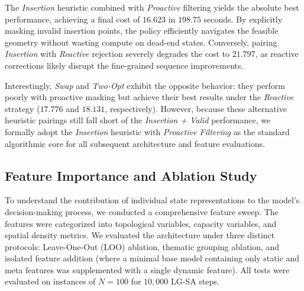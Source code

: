 \documentclass[letterpaper]{article} %
\begin{document}
The \textit{Insertion} heuristic combined with \textit{Proactive} filtering yields the absolute best performance, achieving a final cost of $16.623$ in $198.75$ seconds. By explicitly masking invalid insertion points, the policy efficiently navigates the feasible geometry without wasting compute on dead-end states. Conversely, pairing \textit{Insertion} with \textit{Reactive} rejection severely degrades the cost to $21.797$, as reactive corrections likely disrupt the fine-grained sequence improvements.

Interestingly, \textit{Swap} and \textit{Two-Opt} exhibit the opposite behavior: they perform poorly with proactive masking but achieve their best results under the \textit{Reactive} strategy ($17.776$ and $18.131$, respectively). However, because these alternative heuristic pairings still fall short of the \textit{Insertion + Valid} performance, we formally adopt the \textit{Insertion} heuristic with \textit{Proactive Filtering} as the standard algorithmic core for all subsequent architecture and feature evaluations.

\subsection{Feature Importance and Ablation Study}
\label{sec:feature_ablation}

To understand the contribution of individual state representations to the model's decision-making process, we conducted a comprehensive feature sweep. The features were categorized into topological variables, capacity variables, and spatial density metrics. We evaluated the architecture under three distinct protocols: Leave-One-Out (LOO) ablation, thematic grouping ablation, and isolated feature addition (where a minimal base model containing only static and meta features was supplemented with a single dynamic feature). All tests were evaluated on instances of $N=100$ for $10{,}000$ LG-SA steps.
\end{document}
